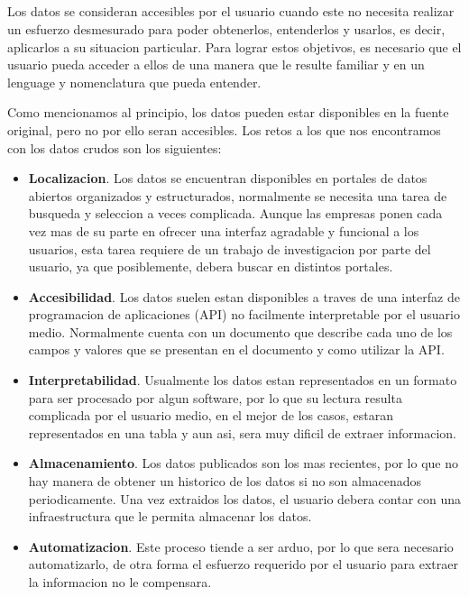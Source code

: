 \subsection*{}
Los datos se consideran accesibles por el usuario cuando este no necesita realizar un esfuerzo desmesurado para
poder obtenerlos, entenderlos y usarlos, es decir, aplicarlos a su situacion particular. Para lograr estos objetivos,
es necesario que el usuario pueda acceder a ellos de una manera que le resulte familiar y en un lenguage y nomenclatura
que pueda entender. 

Como mencionamos al principio, los datos pueden estar disponibles en la fuente original, pero no por ello seran accesibles.
Los retos a los que nos encontramos con los datos crudos son los siguientes:
    
    \begin{itemize}
        \item \textbf{Localizacion}. Los datos se encuentran disponibles en portales de datos abiertos organizados 
        y estructurados, normalmente se necesita una tarea de busqueda y seleccion
        a veces complicada. Aunque las empresas ponen cada vez mas de su parte en ofrecer una interfaz 
        agradable y funcional a los usuarios, esta tarea requiere de un trabajo de investigacion por parte del usuario,
        ya que posiblemente, debera buscar en distintos portales.
        \item \textbf{Accesibilidad}. Los datos suelen estan disponibles a traves de una interfaz de programacion 
        de aplicaciones (API) no facilmente interpretable por el usuario medio. Normalmente cuenta con 
        un documento que describe cada uno de los campos y valores que se presentan en el documento y como utilizar la API.
        \item \textbf{Interpretabilidad}. Usualmente los datos estan representados en un formato para ser procesado por 
        algun software, por lo que su lectura resulta complicada por el usuario medio, en el mejor de los casos, 
        estaran representados en una tabla y aun asi, sera muy dificil de extraer informacion.
        \item \textbf{Almacenamiento}. Los datos publicados son los mas recientes, por lo que no hay manera de obtener 
        un historico de los datos si no son almacenados periodicamente. Una vez extraidos los datos, el usuario debera 
        contar con una infraestructura que le permita almacenar los datos.
        \item \textbf{Automatizacion}. Este proceso tiende a ser arduo, por lo que sera necesario automatizarlo, de otra 
        forma el esfuerzo requerido por el usuario para extraer la informacion no le compensara.
         
    \end{itemize}
    
